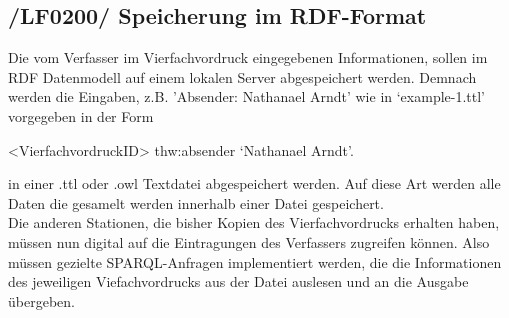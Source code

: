 \subsection{/LF0200/ Speicherung im RDF-Format}
Die vom Verfasser im Vierfachvordruck eingegebenen Informationen, sollen im RDF Datenmodell auf einem lokalen Server abgespeichert werden. Demnach werden die Eingaben, z.B. 'Absender: Nathanael Arndt' wie in `example-1.ttl' vorgegeben in der Form 
\begin{center}<VierfachvordruckID> thw:absender `Nathanael Arndt'. \end{center}
in einer .ttl oder .owl Textdatei abgespeichert werden. Auf diese Art werden alle Daten die gesamelt werden innerhalb einer Datei gespeichert. \\
Die anderen Stationen, die bisher Kopien des Vierfachvordrucks erhalten haben, müssen nun digital auf die Eintragungen des Verfassers zugreifen können. Also müssen gezielte SPARQL-Anfragen implementiert werden, die die Informationen des jeweiligen Viefachvordrucks aus der Datei auslesen und an die Ausgabe übergeben.
